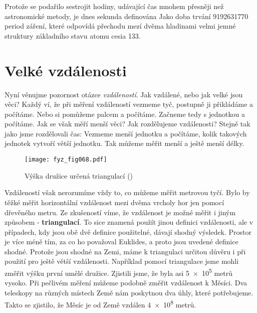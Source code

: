     Protože se podařilo sestrojit hodiny, udávající čas mnohem přesněji než astronomické metody, 
    je dnes sekunda definována Jako doba trvání \num{9192631770} period záření, které odpovídá 
    přechodu mezí dvěma hladinami velmi jemné struktury základního stavu atomu cesia \num{133}.
    
  \section{Velké vzdálenosti}
    Nyní věnujme pozornost otázce \emph{vzdáleností}. Jak vzdálené, nebo jak velké jsou věci? Každý 
    ví, že při měření vzdáleností vezmeme tyč, postupně ji přikládáme a počítáme. Nebo si pomůžeme 
    palcem a počítáme. Začneme tedy s jednotkou a počítáme. Jak se však měří menší věci? Jak 
    rozdělujeme vzdálenosti? Stejně tak jako jsme rozdělovali čas: Vezmeme menší jednotku a 
    počítáme, kolik takových jednotek vytvoří větší jednotku. Tak můžeme měřit menší a ještě menší 
    délky.

    \begin{figure}[ht!]  %
      \centering
      \texttt{[image: fyz\_fig068.pdf]}
      \caption{Výška družice určená triangulací (\cite[s.~70]{Feynman01})}
      \label{fyz:fig068}
    \end{figure}
    
    Vzdáleností však nerozumíme vždy to, co můžeme měřit metrovou tyčí. Bylo by těžké měřit 
    horizontální vzdálenost mezi dvěma vrcholy hor jen pomocí dřevěného metru. Ze zkušeností víme, 
    že vzdálenost je možné měřit i jiným způsobem - \textbf{triangulací}. To sice znamená použít 
    jinou definici vzdálenosti, ale v případech, kdy jsou obě dvě definice použitelné, dávají 
    shodný výsledek. Prostor je více méně tím, za co ho považoval Euklides, a proto jsou uvedené 
    definice shodné. Protože jsou shodné na Zemi, máme k triangulaci určitou důvěru i při použití 
    pro ještě větší vzdálenosti. Například pomocí triangulace jsme mohli změřit výšku první umělé 
    družice. Zjistili jsme, že byla asi \num{5e5} metrů vysoko. Při pečlivém měření můžeme podobně 
    změřit vzdálenost k Měsíci. Dva teleskopy na různých místech Země nám poskytnou dva úhly, které 
    potřebujeme. Takto se zjistilo, že Měsíc je od Země vzdálen \num{4e8} metrů.
    
